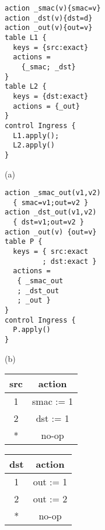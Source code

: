\begin{figure}
\centering
\begin{minipage}[t]{.23\textwidth}
\centering
\begin{framed}\hspace{-.5em}
\begin{lstlisting}[basicstyle=\ttfamily\footnotesize, lineskip = 0em,numbersep=0pt,resetmargins=true, xleftmargin=-1em]
action _smac(v){smac=v}
action _dst(v){dst=d}
action _out(v){out=v}
table L1 {
  keys = {src:exact}
  actions =
    {_smac; _dst}
}
table L2 {
  keys = {dst:exact}
  actions = {_out}
}
control Ingress {
  L1.apply();
  L2.apply()
}
\end{lstlisting}
\end{framed}
(a)
\end{minipage}
\begin{minipage}[t]{.23\textwidth}
\centering
\begin{framed}\hspace{-1em}
\begin{lstlisting}[basicstyle=\ttfamily\footnotesize, lineskip = 0em,numbersep=0pt,resetmargins=true, xleftmargin=-1em]
action _smac_out(v1,v2)
  { smac=v1;out=v2 }
action _dst_out(v1,v2)
  { dst=v1;out=v2 }
action _out(v) {out=v}
table P {
  keys = { src:exact
         ; dst:exact }
  actions =
   { _smac_out
   ; _dst_out
   ; _out }
}
control Ingress {
  P.apply()
}
\end{lstlisting}
\end{framed}
(b)
\end{minipage}

\begin{ttfamily}
\begin{footnotesize}
\setlength{\columnsep}{0pt}
\begin{multicols}{3}
\begin{tabular}{c|c}
 {\ttfamily src} & action \\\hline
       1         & smac := 1 \\
       2         & dst := 1 \\
       *         & no-op
\end{tabular}

\columnbreak

\begin{tabular}{c|c}
 {\ttfamily dst} & action \\\hline
       1         & out := 1 \\
       2         & out := 2 \\
       *         & no-op
\end{tabular}


\end{multicols}
\end{footnotesize}
\end{ttfamily}
\end{figure}
